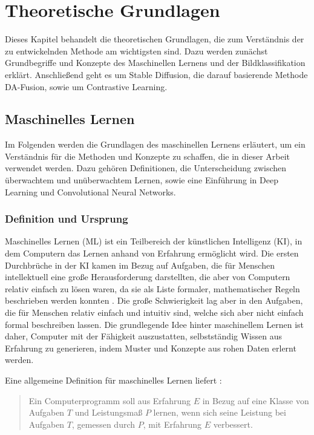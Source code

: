 \chapter{Theoretische Grundlagen}

Dieses Kapitel behandelt die theoretischen Grundlagen, die zum Verständnis der zu entwickelnden Methode am wichtigsten sind. Dazu werden zunächst Grundbegriffe und Konzepte des Maschinellen Lernens und der Bildklassifikation erklärt. Anschließend geht es um Stable Diffusion, die darauf basierende Methode DA-Fusion, sowie um Contrastive Learning.

\section{Maschinelles Lernen}

Im Folgenden werden die Grundlagen des maschinellen Lernens erläutert, um ein Verständnis für die Methoden und Konzepte zu schaffen, die in dieser Arbeit verwendet werden. Dazu gehören Definitionen, die Unterscheidung zwischen überwachtem und unüberwachtem Lernen, sowie eine Einführung in Deep Learning und Convolutional Neural Networks.

\subsection{Definition und Ursprung}

Maschinelles Lernen (ML) ist ein Teilbereich der künstlichen Intelligenz (KI), in dem Computern das Lernen anhand von Erfahrung ermöglicht wird. Die ersten Durchbrüche in der KI kamen im Bezug auf Aufgaben, die für Menschen intellektuell eine große Herausforderung darstellten, die aber von Computern relativ einfach zu lösen waren, da sie als Liste formaler, mathematischer Regeln beschrieben werden konnten \parencite{Goodfellow2016}. Die große Schwierigkeit lag aber in den Aufgaben, die für Menschen relativ einfach und intuitiv sind, welche sich aber nicht einfach formal beschreiben lassen. Die grundlegende Idee hinter maschinellem Lernen ist daher, Computer mit der Fähigkeit auszustatten, selbstständig Wissen aus Erfahrung zu generieren, indem Muster und Konzepte aus rohen Daten erlernt werden.

Eine allgemeine Definition für maschinelles Lernen liefert \parencite{Mitchell1997}:
\begin{quote}
Ein Computerprogramm soll aus Erfahrung $E$ in Bezug auf eine Klasse von Aufgaben $T$ und Leistungsmaß $P$ lernen, wenn sich seine Leistung bei Aufgaben $T$, gemessen durch $P$, mit Erfahrung $E$ verbessert.
\end{quote}

